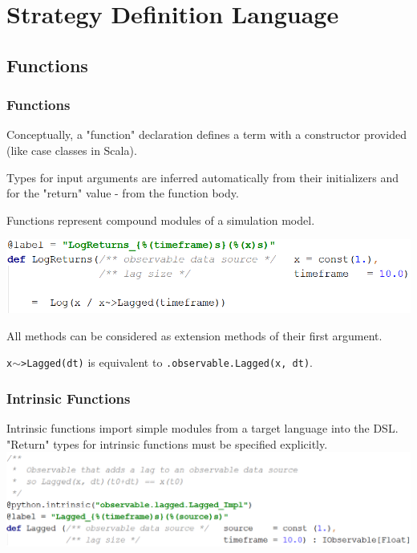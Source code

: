 \documentclass{beamer}
\begin{document}
\section{Strategy Definition Language}
\subsection{Functions}
\begin{frame}
\frametitle{Functions}
Conceptually, a "function" declaration defines a term with a constructor provided (like case classes in Scala).

Types for input arguments are inferred automatically from their initializers and for the "return" value - from the function body.

Functions represent compound modules of a simulation model.

\includegraphics[width=1\linewidth]{logreturns.png}

All methods can be considered as extension methods of their first argument.

\texttt{x$\sim$>Lagged(dt)} is equivalent to \texttt{.observable.Lagged(x, dt)}.
\end{frame}
\begin{frame}
\frametitle{Intrinsic Functions}
Intrinsic functions import simple modules from a target language into the DSL.
"Return" types for intrinsic functions must be specified explicitly.
\includegraphics[width=1\linewidth]{lagged.png}
\end{frame}
\end{document}
